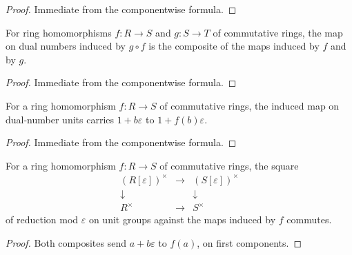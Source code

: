 \begin{proof}\leanok
  Immediate from the componentwise formula.
\end{proof}

\begin{lemma}\leanok
  \label{lem:dual_number_map_comp}
  For ring homomorphisms \(f : R \to S\) and \(g : S \to T\) of
  commutative rings, the map on dual numbers induced by
  \(g \circ f\) is the composite of the maps induced by \(f\) and by
  \(g\).
\end{lemma}

\begin{proof}\leanok
  Immediate from the componentwise formula.
\end{proof}

\begin{lemma}\leanok
  \label{lem:dual_number_map_trunc_exp}
  For a ring homomorphism \(f : R \to S\) of commutative rings, the
  induced map on dual-number units carries \(1 + b\varepsilon\) to
  \(1 + f(b)\varepsilon\).
\end{lemma}

\begin{proof}\leanok
  Immediate from the componentwise formula.
\end{proof}

\begin{lemma}\leanok
  \label{lem:dual_number_units_fst_natural}
  For a ring homomorphism \(f : R \to S\) of commutative rings, the
  square
  \[
    \begin{array}{ccc}
      (R[\varepsilon])^{\times} & \longrightarrow &
        (S[\varepsilon])^{\times} \\
      \downarrow & & \downarrow \\
      R^{\times} & \longrightarrow & S^{\times}
    \end{array}
  \]
  of reduction mod \(\varepsilon\) on unit groups against the maps
  induced by \(f\) commutes.
\end{lemma}

\begin{proof}\leanok
  Both composites send \(a + b\varepsilon\) to \(f(a)\), on first
  components.
\end{proof}

